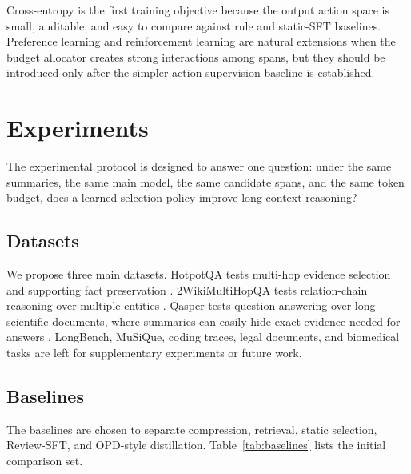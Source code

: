 \documentclass[11pt]{article}
\begin{document}
Cross-entropy is the first training objective because the output action space is small, auditable, and easy to compare against rule and static-SFT baselines. Preference learning and reinforcement learning are natural extensions when the budget allocator creates strong interactions among spans, but they should be introduced only after the simpler action-supervision baseline is established.

\section{Experiments}

The experimental protocol is designed to answer one question: under the same summaries, the same main model, the same candidate spans, and the same token budget, does a learned selection policy improve long-context reasoning?

\subsection{Datasets}

We propose three main datasets. HotpotQA tests multi-hop evidence selection and supporting fact preservation \citep{yang2018hotpotqa}. 2WikiMultiHopQA tests relation-chain reasoning over multiple entities \citep{ho2020constructing}. Qasper tests question answering over long scientific documents, where summaries can easily hide exact evidence needed for answers \citep{dasigi2021qasper}. LongBench, MuSiQue, coding traces, legal documents, and biomedical tasks are left for supplementary experiments or future work.

\subsection{Baselines}

The baselines are chosen to separate compression, retrieval, static selection, Review-SFT, and OPD-style distillation. Table~\ref{tab:baselines} lists the initial comparison set.
\end{document}
